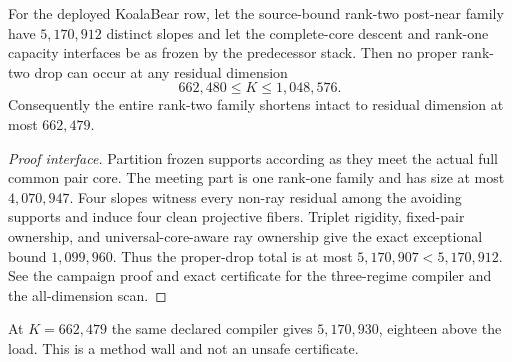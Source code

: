 
\begin{theorem}
\label{thm:kb-rank12-four-block-payment}
For the deployed KoalaBear row, let the source-bound rank-two post-near family
have $5{,}170{,}912$ distinct slopes and let the complete-core descent and
rank-one capacity interfaces be as frozen by the predecessor stack.  Then no
proper rank-two drop can occur at any residual dimension
\[
 662{,}480\le K\le1{,}048{,}576.
\]
Consequently the entire rank-two family shortens intact to residual dimension
at most $662{,}479$.
\end{theorem}

\begin{proof}[Proof interface]
Partition frozen supports according as they meet the actual full common pair
core.  The meeting part is one rank-one family and has size at most
$4{,}070{,}947$.  Four slopes witness every non-ray residual among the
avoiding supports and induce four clean projective fibers.  Triplet rigidity,
fixed-pair ownership, and universal-core-aware ray ownership give the exact
exceptional bound $1{,}099{,}960$.  Thus the proper-drop total is at most
$5{,}170{,}907<5{,}170{,}912$.  See the campaign proof and exact certificate
for the three-regime compiler and the all-dimension scan.
\end{proof}

\begin{remark}
At $K=662{,}479$ the same declared compiler gives $5{,}170{,}930$, eighteen
above the load.  This is a method wall and not an unsafe certificate.
\end{remark}
